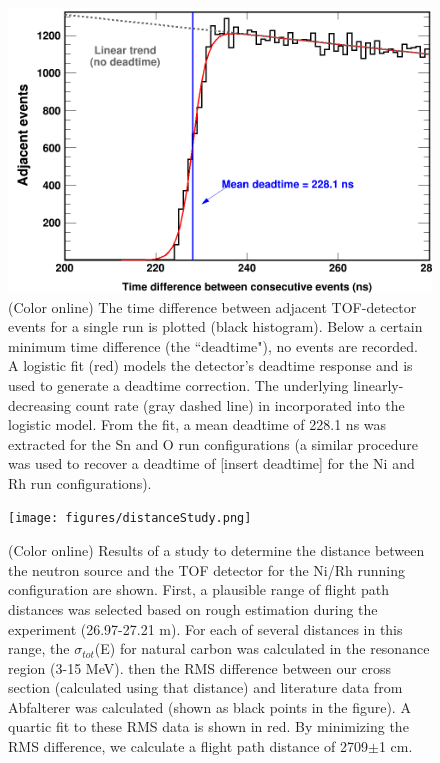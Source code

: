 \documentclass[twocolumn,secnumarabic,amssymb, nobibnotes, aps, prl,
superscriptaddress, nobalancelastpage]{revtex4}
\newcommand{\totEs}{\ensuremath{\sigma_{tot}}(E)\,\,}
\begin{document}
\begin{figure}
    \includegraphics[scale=0.24]{figures/TimeDifferenceBetweenEvents.png}
    \caption{(Color online) The time difference between adjacent TOF-detector
    events for a single run is plotted (black histogram). Below a certain
minimum time difference (the ``deadtime"), no events are recorded. A logistic
fit (red) models the detector's deadtime response and is used to generate a
deadtime correction. The underlying linearly-decreasing count rate (gray dashed
line) in incorporated into the logistic model. From the fit, a mean deadtime of
228.1 ns was extracted for the Sn and O run configurations (a similar
procedure was used to recover a deadtime of [insert deadtime] for the Ni and Rh
run configurations).}
    \label{TimeDifferenceBetweenEvents}
\end{figure}

\begin{figure}
    \texttt{[image: figures/distanceStudy.png]}
    \caption{(Color online) Results of a study to determine the distance between
    the neutron source and the TOF detector for the Ni/Rh running configuration
are shown. First, a plausible range of flight path distances was selected based
on rough estimation during the experiment (26.97-27.21 m). For each of several
distances in this range, the \totEs for natural carbon was calculated in the
resonance region (3-15 MeV). then the RMS difference between our cross section
(calculated using that distance) and literature data from Abfalterer
\cite{Abfalterer2000, Abfalterer2001} was calculated (shown as black points in
the figure). A quartic fit to these RMS data is shown in red. By minimizing the
RMS difference, we calculate a flight path distance of 2709$\pm$1 cm.}
    \label{DistanceStudy}
\end{figure}
\end{document}
